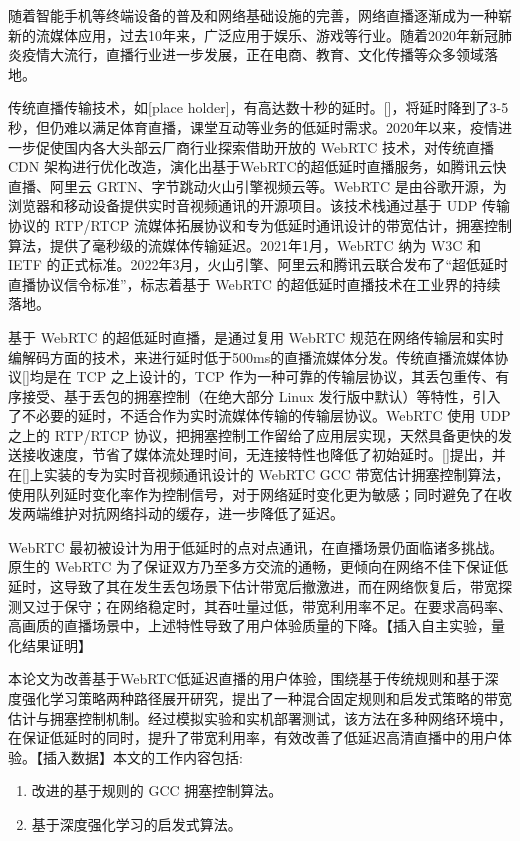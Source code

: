 
随着智能手机等终端设备的普及和网络基础设施的完善，网络直播逐渐成为一种崭新的流媒体应用，过去10年来，广泛应用于娱乐、游戏等行业。随着2020年新冠肺炎疫情大流行，直播行业进一步发展，正在电商、教育、文化传播等众多领域落地。

传统直播传输技术，如[place holder]，有高达数十秒的延时。[]，将延时降到了3-5秒，但仍难以满足体育直播，课堂互动等业务的低延时需求。2020年以来，疫情进一步促使国内各大头部云厂商行业探索借助开放的 WebRTC 技术，对传统直播 CDN 架构进行优化改造，演化出基于WebRTC的超低延时直播服务，如腾讯云快直播、阿里云 GRTN、字节跳动火山引擎视频云等。WebRTC 是由谷歌开源，为浏览器和移动设备提供实时音视频通讯的开源项目。该技术栈通过基于 UDP 传输协议的 RTP/RTCP 流媒体拓展协议和专为低延时通讯设计的带宽估计，拥塞控制算法，提供了毫秒级的流媒体传输延迟。2021年1月，WebRTC 纳为 W3C 和 IETF 的正式标准\cite{1220034}。2022年3月，火山引擎、阿里云和腾讯云联合发布了“超低延时直播协议信令标准”，标志着基于 WebRTC 的超低延时直播技术在工业界的持续落地。

基于 WebRTC 的超低延时直播，是通过复用 WebRTC 规范在网络传输层和实时编解码方面的技术，来进行延时低于500ms的直播流媒体分发。传统直播流媒体协议[]均是在 TCP 之上设计的，TCP 作为一种可靠的传输层协议，其丢包重传、有序接受、基于丢包的拥塞控制（在绝大部分 Linux 发行版中默认）等特性，引入了不必要的延时，不适合作为实时流媒体传输的传输层协议。WebRTC 使用 UDP 之上的 RTP/RTCP 协议，把拥塞控制工作留给了应用层实现，天然具备更快的发送接收速度，节省了媒体流处理时间，无连接特性也降低了初始延时。[]提出，并在[]上实装的专为实时音视频通讯设计的 WebRTC GCC 带宽估计拥塞控制算法，使用队列延时变化率作为控制信号，对于网络延时变化更为敏感；同时避免了在收发两端维护对抗网络抖动的缓存，进一步降低了延迟。

WebRTC 最初被设计为用于低延时的点对点通讯，在直播场景仍面临诸多挑战。原生的 WebRTC 为了保证双方乃至多方交流的通畅，更倾向在网络不佳下保证低延时，这导致了其在发生丢包场景下估计带宽后撤激进，而在网络恢复后，带宽探测又过于保守；在网络稳定时，其吞吐量过低，带宽利用率不足。在要求高码率、高画质的直播场景中，上述特性导致了用户体验质量的下降。【插入自主实验，量化结果证明】

本论文为改善基于WebRTC低延迟直播的用户体验，围绕基于传统规则和基于深度强化学习策略两种路径展开研究，提出了一种混合固定规则和启发式策略的带宽估计与拥塞控制机制。经过模拟实验和实机部署测试，该方法在多种网络环境中，在保证低延时的同时，提升了带宽利用率，有效改善了低延迟高清直播中的用户体验。【插入数据】本文的工作内容包括:
\begin{enumerate}[wide,]
    \item 改进的基于规则的 GCC 拥塞控制算法。
    \item 基于深度强化学习的启发式算法。
\end{enumerate}